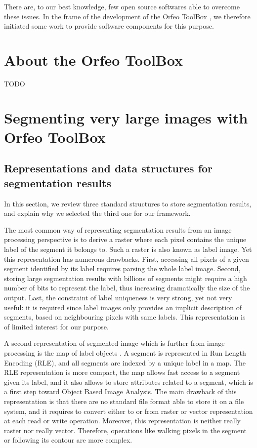 \documentclass{josis}
\begin{document}
There are, to our best knowledge, few open source softwares able to
overcome these issues. In the frame of the development of the Orfeo
ToolBox \cite{}, we therefore initiated some work to provide software
components for this purpose.

\section{About the Orfeo ToolBox}

TODO

\section{Segmenting very large images with Orfeo ToolBox}


\subsection{Representations and data structures for segmentation results}

In this section, we review three standard structures to store
segmentation results, and explain why we selected the third one for
our framework.

The most common way of representing segmentation results from an image
processing perspective is to derive a raster where each pixel contains
the unique label of the segment it belongs to. Such a raster is also
known as label image. Yet this representation has numerous
drawbacks. First, accessing all pixels of a given segment identified
by its label requires parsing the whole label image. Second, storing
large segmentation results with billions of segments might require a
high number of bits to represent the label, thus increasing
dramatically the size of the output. Last, the constraint of label
uniqueness is very strong, yet not very useful: it is required since
label images only provides an implicit description of segments, based
on neighbouring pixels with same labels. This representation is of
limited interest for our purpose.

A second representation of segmented image which is further from image
processing is the map of label objects \cite{lehmann2008label}. A segment is
represented in Run Length Encoding (RLE), and all segments are indexed
by a unique label in a map. The RLE representation is more compact,
the map allows fast access to a segment given its label, and it also
allows to store attributes related to a segment, which is a first step
toward Object Based Image Analysis. The main drawback of this
representation is that there are no standard file format able to store
it on a file system, and it requires to convert either to or from
raster or vector representation at each read or write
operation. Moreover, this representation is neither really raster nor
really vector. Therefore, operations like walking pixels in the
segment or following its contour are more complex.
\end{document}
